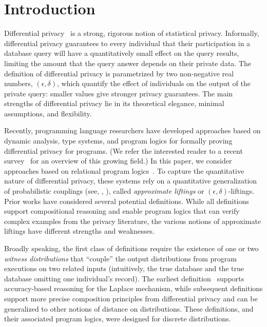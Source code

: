 \documentclass{lmcs}
\begin{document}
\section{Introduction}
Differential privacy~\citep{DMNS06} is a strong, rigorous notion of statistical
privacy. Informally, differential privacy guarantees to every individual that
their participation in a database query will have a quantitatively small effect
on the query results, limiting the amount that the query answer depends on their
private data. The definition of differential privacy is parametrized by two
non-negative real numbers, $(\epsilon, \delta)$, which quantify the effect of
individuals on the output of the private query: smaller values give stronger
privacy guarantees. The main strengths of differential privacy lie in its
theoretical elegance, minimal assumptions, and flexibility.

Recently, programming language researchers have developed approaches based on
dynamic analysis, type systems, and program logics for formally proving
differential privacy for programs. (We refer the interested reader to a recent
survey~\citep{BartheGHP16} for an overview of this growing field.)  In this
paper, we consider approaches based on relational program
logics~\citep{BartheKOZ13,BartheO13,OlmedoThesis,BartheFGGHS16,BartheGGHS16,Sato16}.
To capture the quantitative nature of differential privacy, these systems rely
on a quantitative generalization of probabilistic couplings (see, \eg,
\citep{Lindvall02,Thorisson00,Villani08}), called \emph{approximate liftings} or
$(\epsilon, \delta)$-liftings.  Prior works have considered several potential
definitions. While all definitions support compositional reasoning and enable
program logics that can verify complex examples from the privacy literature, the
various notions of approximate liftings have different strengths and weaknesses.

Broadly speaking, the first class of definitions require the existence of one or
two \emph{witness distributions} that ``couple'' the output distributions from
program executions on two related inputs (intuitively, the true database and the
true database omitting one individual's record). The earliest
definition~\citep{BartheKOZ13} supports accuracy-based reasoning for the Laplace
mechanism, while subsequent definitions \citep{BartheO13,OlmedoThesis} support
more precise composition principles from differential privacy and can be
generalized to other notions of distance on distributions. These definitions,
and their associated program logics, were designed for discrete distributions.
\end{document}
